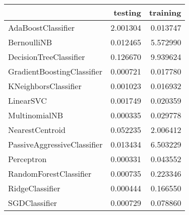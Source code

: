 \begin{tabular}{lrr}
\toprule
{} &   testing &  training \\
\midrule
AdaBoostClassifier          &  2.001304 &  0.013747 \\
BernoulliNB                 &  0.012465 &  5.572990 \\
DecisionTreeClassifier      &  0.126670 &  9.939624 \\
GradientBoostingClassifier  &  0.000721 &  0.017780 \\
KNeighborsClassifier        &  0.001023 &  0.016932 \\
LinearSVC                   &  0.001749 &  0.020359 \\
MultinomialNB               &  0.000335 &  0.029778 \\
NearestCentroid             &  0.052235 &  2.006412 \\
PassiveAggressiveClassifier &  0.013434 &  6.503229 \\
Perceptron                  &  0.000331 &  0.043552 \\
RandomForestClassifier      &  0.000735 &  0.223346 \\
RidgeClassifier             &  0.000444 &  0.166550 \\
SGDClassifier               &  0.000729 &  0.078860 \\
\bottomrule
\end{tabular}

